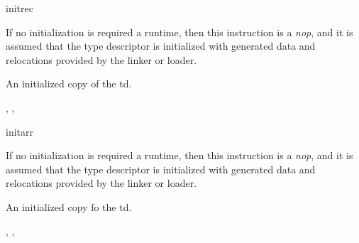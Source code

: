 \begin{instruction}{initrec}

  \begin{notes}
    If no initialization is required a runtime, then this instruction
    is a \emph{nop}, and it is assumed that the type descriptor is
    initialized with generated data and relocations provided by the
    linker or loader.
  \end{notes}

  \begin{results}
  \item An initialized copy of the \ac{td}.
  \end{results}

  \begin{operands}
  \item {}
  \end{operands}

  \begin{seealso}
    , ,
  \end{seealso}
\end{instruction}

\begin{instruction}{initarr}

  \begin{notes}
    If no initialization is required a runtime, then this instruction
    is a \emph{nop}, and it is assumed that the type descriptor is
    initialized with generated data and relocations provided by the
    linker or loader.
  \end{notes}

  \begin{results}
  \item An initialized copy fo the \ac{td}.
  \end{results}

  \begin{operands}
  \item {}
  \end{operands}

  \begin{seealso}
    , ,
  \end{seealso}
\end{instruction}

